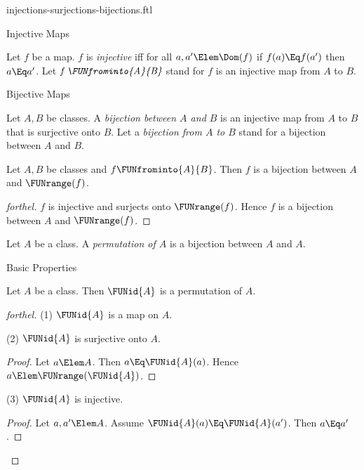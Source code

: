 \documentclass{stex}
\begin{document}
\begin{smodule}{injections-surjections-bijections.ftl}
\begin{sfragment}{Injective Maps}
  \begin{definition}[forthel]
    Let $f$ be a map.
    $f$ is \emph{injective} iff for all $a, a' \Elem \Dom(f)$ if $f(a) \Eq f(a')$ then $a \Eq a'$.
    Let $\emph{f \FUNfrominto{A}{B}}$ stand for $f$ is an injective map from $A$ to $B$.
  \end{definition}
\end{sfragment}

\begin{sfragment}{Bijective Maps}
  \begin{definition}[forthel]
    Let $A, B$ be classes.
    A \emph{bijection between $A$ and $B$} is an injective map from $A$ to $B$ that is surjective onto $B$.
    Let a \emph{bijection from $A$ to $B$} stand for a bijection between $A$ and $B$.
  \end{definition}

  \begin{proposition}[forthel]
    Let $A, B$ be classes and $f \FUNfrominto{A}{B}$.
    Then $f$ is a bijection between $A$ and $\FUNrange(f)$.
  \end{proposition}
  \begin{proof}[forthel]
    $f$ is injective and surjects onto $\FUNrange(f)$.
    Hence $f$ is a bijection between $A$ and $\FUNrange(f)$.
  \end{proof}

  \begin{definition}[forthel]
    Let $A$ be a class.
    A \emph{permutation of $A$} is a bijection between $A$ and $A$.
  \end{definition}
\end{sfragment}

\begin{sfragment}{Basic Properties}
  \begin{proposition}[forthel]
    Let $A$ be a class.
    Then $\FUNid{A}$ is a permutation of $A$.
  \end{proposition}
  \begin{proof}[forthel]
    (1) $\FUNid{A}$ is a map on $A$.

    (2) $\FUNid{A}$ is surjective onto $A$.
    \begin{proof}
      Let $a \Elem A$.
      Then $a \Eq \FUNid{A}(a)$.
      Hence $a \Elem \FUNrange(\FUNid{A})$.
    \end{proof}

    (3) $\FUNid{A}$ is injective.
    \begin{proof}
      Let $a, a' \Elem A$.
      Assume $\FUNid{A}(a) \Eq \FUNid{A}(a')$.
      Then $a \Eq a'$.
    \end{proof}
  \end{proof}


\end{sfragment}
\end{smodule}
\end{document}
